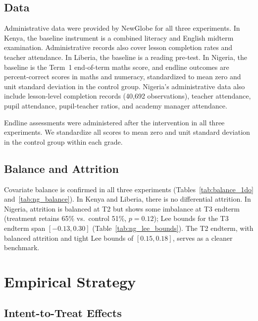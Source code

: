 \documentclass[11pt]{article}
\begin{document}
\subsection{Data}

Administrative data were provided by NewGlobe for all three experiments. In Kenya, the baseline instrument is a combined literacy and English midterm examination. Administrative records also cover lesson completion rates and teacher attendance. In Liberia, the baseline is a reading pre-test. In Nigeria, the baseline is the Term~1 end-of-term maths score, and endline outcomes are percent-correct scores in maths and numeracy, standardized to mean zero and unit standard deviation in the control group. Nigeria's administrative data also include lesson-level completion records (40,692 observations), teacher attendance, pupil attendance, pupil-teacher ratios, and academy manager attendance.

Endline assessments were administered after the intervention in all three experiments. We standardize all scores to mean zero and unit standard deviation in the control group within each grade.

\subsection{Balance and Attrition}

Covariate balance is confirmed in all three experiments (Tables~\ref{tab:balance_1do} and~\ref{tab:ng_balance}). In Kenya and Liberia, there is no differential attrition. In Nigeria, attrition is balanced at T2 but shows some imbalance at T3 endterm (treatment retains 65\% vs.\ control 51\%, $p = 0.12$); Lee bounds for the T3 endterm span $[-0.13, 0.30]$ (Table~\ref{tab:ng_lee_bounds}). The T2 endterm, with balanced attrition and tight Lee bounds of $[0.15, 0.18]$, serves as a cleaner benchmark.


\section{Empirical Strategy}
\label{sec:strategy}

\subsection{Intent-to-Treat Effects}
\end{document}
